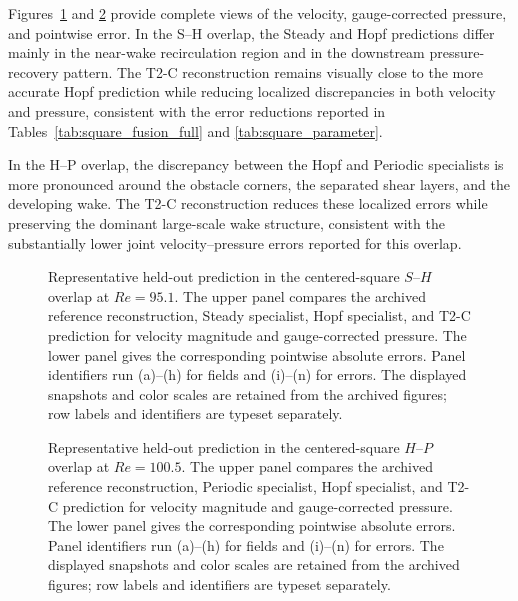 \documentclass{article}
\begin{document}
Figures~\ref{fig:app_square_sh_full} and \ref{fig:app_square_hp_full} provide complete views of the velocity, gauge-corrected pressure, and pointwise error. In the S--H overlap, the Steady and Hopf predictions differ mainly in the near-wake recirculation region and in the downstream pressure-recovery pattern. The T2-C reconstruction remains visually close to the more accurate Hopf prediction while reducing localized discrepancies in both velocity and pressure, consistent with the error reductions reported in Tables~\ref{tab:square_fusion_full} and \ref{tab:square_parameter}.

In the H--P overlap, the discrepancy between the Hopf and Periodic specialists is more pronounced around the obstacle corners, the separated shear layers, and the developing wake. The T2-C reconstruction reduces these localized errors while preserving the dominant large-scale wake structure, consistent with the substantially lower joint velocity--pressure errors reported for this overlap.

\par
\begin{figure}[p]
\centering
{}

\vspace{0.35em}
\caption{Representative held-out prediction in the centered-square
$S$--$H$ overlap at $Re=95.1$. The upper panel compares the archived reference reconstruction,
Steady specialist, Hopf specialist, and T2-C prediction for velocity
magnitude and gauge-corrected pressure. The lower panel gives the
corresponding pointwise absolute errors. Panel identifiers run (a)--(h) for fields and (i)--(n) for errors. The displayed snapshots and color scales are retained from the archived figures; row labels and identifiers are typeset separately.}
\label{fig:app_square_sh_full}
\end{figure}
\par

\par
\begin{figure}[p]
\centering
{}

\vspace{0.35em}
\caption{Representative held-out prediction in the centered-square
$H$--$P$ overlap at $Re=100.5$. The upper panel compares the archived reference reconstruction, Periodic specialist, Hopf specialist, and T2-C prediction for velocity magnitude and gauge-corrected pressure. The lower panel gives the
corresponding pointwise absolute errors. Panel identifiers run (a)--(h) for fields and (i)--(n) for errors. The displayed snapshots and color scales are retained from the archived figures; row labels and identifiers are typeset separately.}
\label{fig:app_square_hp_full}
\end{figure}
\par
\end{document}
